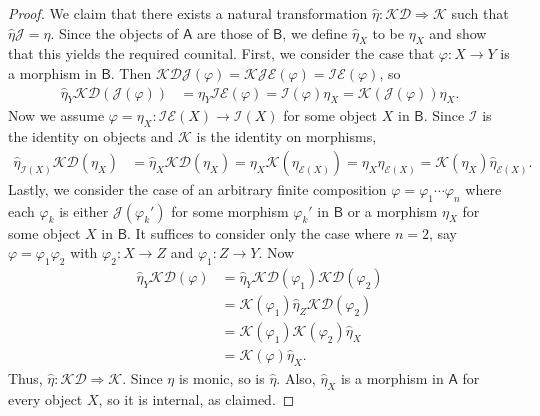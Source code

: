 \documentclass{amsart}
\newcommand{\Cat}[1]{\mathsf{#1}}
\newcommand{\cat}[1]{\Cat{#1}}
\newcommand{\acat}[1]{\mathsf{#1}}
\numberwithin{lstfloat}{section}
\newcommand{\func}[1]{\mathcal{#1}}
\newcommand{\fD}{\func{D}}
\newcommand{\fI}{\func{I}}
\newcommand{\fJ}{\func{J}}
\newcommand{\fK}{\func{K}}
\theoremstyle{definition}
\theoremstyle{remark}
\numberwithin{equation}{section}
\begin{document}
\begin{proof}
  We claim that there exists a natural transformation
  $\hat{\eta}:\func{K}\func{D}\Rightarrow \func{K}$ such that
  $\hat{\eta}\func{J} = \eta$. 
  Since the
  objects of $\cat{A}$ are those of $\cat{B}$, we define $\hat{\eta}_X$ to be
  $\eta_X$ and show that this yields the required counital. First, we consider
  the case that $\varphi : X\to Y$ is a morphism in $\cat{B}$. Then $\func{K} \func{D}
  \func{J}(\varphi)=\func{K} \func{J} \func{E}(\varphi)=\func{I}
  \func{E}(\varphi)$, so
  \begin{align*}
    \hat{\eta}_Y \func{K} \func{D}(\func{J}(\varphi)) 
    & = \eta_Y \func{I} \func{E}(\varphi) = \func{I}(\varphi)\eta_X 
     = \func{K}(\func{J}(\varphi))\hat{\eta}_X.
  \end{align*} 
  Now we assume $\varphi = \eta_X: \func{IE}(X)\to \func{I}(X)$ for some
  object $X$ in $\cat{B}$. Since $\fI$ is the identity on objects and $\fK$ is the identity on morphisms, 
  \begin{align*}
    \hat{\eta}_{\func{I}(X)} \func{K} \func{D}(\eta_X) 
    & = \hat{\eta}_X\func{KD}(\eta_X) = \eta_{X} \func{K}(\eta_{ \func{E}(X)})  
     = \eta_{X} \eta_{ \func{E}(X)}  = \func{K}(\eta_X)\hat{\eta}_{ \func{E}(X)}.
  \end{align*}
  Lastly, we consider the case of an arbitrary finite composition
  $\varphi=\varphi_1\cdots \varphi_n$ where each  $\varphi_k$ is either $\fJ(\varphi_k')$ for some morphism $\varphi_k'$ in $\acat{B}$ or a morphism $\eta_X$ for some object $X$ in $\acat{B}$. It suffices to consider
  only the case where $n=2$, say $\varphi = \varphi_1\varphi_2$ with $\varphi_2
  : X\to Z$ and $\varphi_1: Z\to Y$. Now 
  \begin{align*}
    \hat{\eta}_Y \func{K} \func{D}(\varphi) 
    & = \hat{\eta}_Y \func{K} \func{D}(\varphi_1) \func{K} \func{D}(\varphi_2) \\
    & = \func{K}(\varphi_1)\hat{\eta}_{Z} \func{K} \fD(\varphi_2) \\
    & = \func{K}(\varphi_1) \func{K}(\varphi_2)\hat{\eta}_{X}\\
    & = \func{K}(\varphi)\hat{\eta}_X.
  \end{align*} 
 Thus, 
$\hat{\eta}:\func{K} \func{D}\Rightarrow \func{K}$. Since $\eta$ is monic, so is $\hat{\eta}$.  Also, $\hat{\eta}_X$ is a morphism in $\cat{A}$ for every object $X$, so it is  internal, as claimed.
\end{proof}
\end{document}
